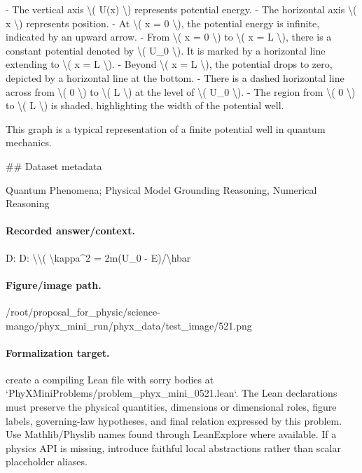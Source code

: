 - The vertical axis \textbackslash{}( U(x) \textbackslash{}) represents potential energy.
- The horizontal axis \textbackslash{}( x \textbackslash{}) represents position.
- At \textbackslash{}( x = 0 \textbackslash{}), the potential energy is infinite, indicated by an upward arrow.
- From \textbackslash{}( x = 0 \textbackslash{}) to \textbackslash{}( x = L \textbackslash{}), there is a constant potential denoted by \textbackslash{}( U\_0 \textbackslash{}). It is marked by a horizontal line extending to \textbackslash{}( x = L \textbackslash{}).
- Beyond \textbackslash{}( x = L \textbackslash{}), the potential drops to zero, depicted by a horizontal line at the bottom.
- There is a dashed horizontal line across from \textbackslash{}( 0 \textbackslash{}) to \textbackslash{}( L \textbackslash{}) at the level of \textbackslash{}( U\_0 \textbackslash{}).
- The region from \textbackslash{}( 0 \textbackslash{}) to \textbackslash{}( L \textbackslash{}) is shaded, highlighting the width of the potential well.

This graph is a typical representation of a finite potential well in quantum mechanics.

\#\# Dataset metadata

Quantum Phenomena; Physical Model Grounding Reasoning, Numerical Reasoning

\paragraph{Recorded answer/context.}
D: D: \textbackslash{}\textbackslash{}( \textbackslash{}kappa\textasciicircum{}2 = 2m(U\_0 - E)/\textbackslash{}hbar

\paragraph{Figure/image path.}
/root/proposal\_for\_physic/science-mango/phyx\_mini\_run/phyx\_data/test\_image/521.png

\paragraph{Formalization target.}
create a compiling Lean file with sorry bodies at `PhyXMiniProblems/problem\_phyx\_mini\_0521.lean`. The Lean declarations must preserve the physical quantities, dimensions or dimensional roles, figure labels, governing-law hypotheses, and final relation expressed by this problem.
Use Mathlib/Physlib names found through LeanExplore where available. If a physics API is missing, introduce faithful local abstractions rather than scalar placeholder aliases.

